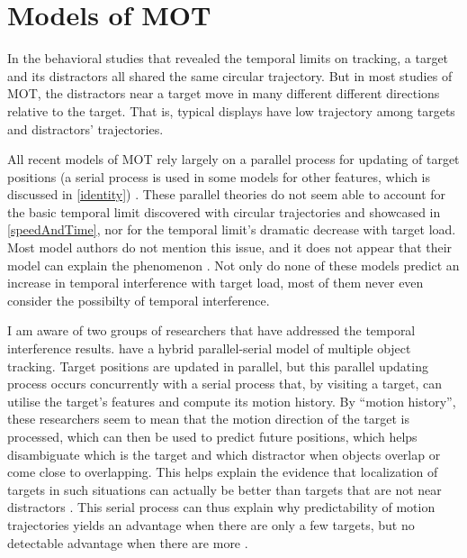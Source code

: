 \documentclass[
]{book}
\begin{document}
\hypertarget{models-of-mot}{%
\section{Models of MOT}\label{models-of-mot}}

In the behavioral studies that revealed the temporal limits on tracking, a target and its distractors all shared the same circular trajectory. But in most studies of MOT, the distractors near a target move in many different different directions relative to the target. That is, typical displays have low trajectory among targets and distractors' trajectories.

All recent models of MOT rely largely on a parallel process for updating of target positions (a serial process is used in some models for other features, which is discussed in \ref{identity}) \citep{oksamaPositionTrackingIdentity2016, lovettSelectionEnablesEnhancement2019, liModelMultipleIdentity2019, oksamaDynamicBindingIdentity2008a, srivastavaAttentionDynamicsMultiple2015, kazanovichOscillatoryNeuralModel2006}. These parallel theories do not seem able to account for the basic temporal limit discovered with circular trajectories and showcased in \ref{speedAndTime}, nor for the temporal limit's dramatic decrease with target load. Most model authors do not mention this issue, and it does not appear that their model can explain the phenomenon \citep{srivastavaAttentionDynamicsMultiple2015, vulExplainingHumanMultiple2010, maNoCapacityLimit2009}. Not only do none of these models predict an increase in temporal interference with target load, most of them never even consider the possibilty of temporal interference.

I am aware of two groups of researchers that have addressed the temporal interference results. \citet{lovettSelectionEnablesEnhancement2019} have a hybrid parallel-serial model of multiple object tracking. Target positions are updated in parallel, but this parallel updating process occurs concurrently with a serial process that, by visiting a target, can utilise the target's features and compute its motion history. By ``motion history'', these researchers seem to mean that the motion direction of the target is processed, which can then be used to predict future positions, which helps disambiguate which is the target and which distractor when objects overlap or come close to overlapping. This helps explain the evidence that localization of targets in such situations can actually be better than targets that are not near distractors \citep{srivastavaAttentionModulatesSpatial2016}. This serial process can thus explain why predictability of motion trajectories yields an advantage when there are only a few targets, but no detectable advantage when there are more \citep{howeMotionInformationSometimes2012, luuExtrapolationOccursMultiple2015}.
\end{document}
